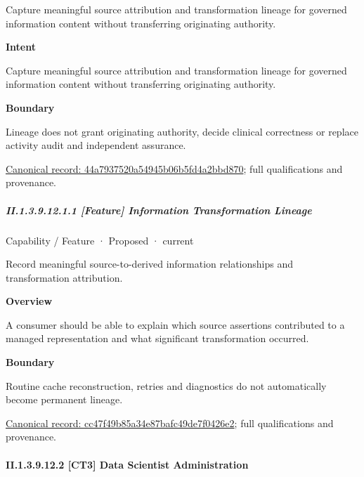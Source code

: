 Capture meaningful source attribution and transformation lineage for governed information content without transferring originating authority.



\textbf{Intent}



Capture meaningful source attribution and transformation lineage for governed information content without transferring originating authority.



\textbf{Boundary}



Lineage does not grant originating authority, decide clinical correctness or replace activity audit and independent assurance.


{\footnotesize \href{../../../../continuum/strategy/capability/44a7937520a54945b06b5fd4a2bbd870.md}{Canonical record: 44a7937520a54945b06b5fd4a2bbd870}; full qualifications and provenance.}\par
\subparagraph*{II.1.3.9.12.1.1 [Feature] Information Transformation Lineage}
\label{navigation:II.1.3.9.12.1.1}

\label{element:cc47f49b85a34e87bafc49de7f0426e2}
{\small Capability / Feature · Proposed · current}\par

Record meaningful source-to-derived information relationships and transformation attribution.



\textbf{Overview}



A consumer should be able to explain which source assertions contributed to a managed representation and what significant transformation occurred.



\textbf{Boundary}



Routine cache reconstruction, retries and diagnostics do not automatically become permanent lineage.


{\footnotesize \href{../../../../continuum/strategy/capability/feature/cc47f49b85a34e87bafc49de7f0426e2.md}{Canonical record: cc47f49b85a34e87bafc49de7f0426e2}; full qualifications and provenance.}\par
\paragraph*{II.1.3.9.12.2 [CT3] Data Scientist Administration}
\label{navigation:II.1.3.9.12.2}

